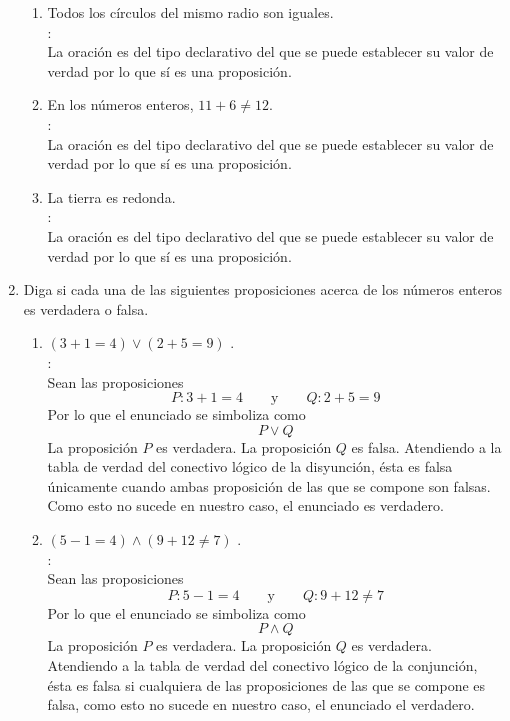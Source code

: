 \begin{enumerate}[label=0.1.\arabic*]
\begin{enumerate}[label=\arabic*)]
		\item Todos los círculos del mismo radio son iguales. \\
		\solucion: \\
		La oración es del tipo declarativo del que se puede establecer su valor de verdad por lo que sí es una proposición.
		
		\item En los números enteros, $ 11+6 \neq 12 $. \\
		\solucion: \\
		La oración es del tipo declarativo del que se puede establecer su valor de verdad por lo que sí es una proposición.
		
		\item La tierra es redonda. \\
		\solucion: \\
		La oración es del tipo declarativo del que se puede establecer su valor de verdad por lo que sí es una proposición.
		
	\end{enumerate}

	\item Diga si cada una de las siguientes proposiciones acerca de los números enteros es verdadera o falsa.
	\begin{enumerate}[label=\arabic*)]
		\item $ (3+1 = 4) \vee (2+5 = 9) $ . \\
		\solucion: \\
		Sean las proposiciones
		\[ P: 3+1 = 4 \qquad \text{y} \qquad Q: 2+5 = 9\]
		Por lo que el enunciado se simboliza como
		\[ P \vee Q \]
		La proposición $ P $ es verdadera. La proposición $ Q $ es falsa. Atendiendo a la tabla de verdad del conectivo lógico de la disyunción, ésta es falsa únicamente cuando ambas proposición de las que se compone son falsas. Como esto no sucede en nuestro caso, el enunciado es verdadero.
		
		\item $ (5-1 = 4) \wedge (9+12 \neq 7) $ . \\
		\solucion: \\
		Sean las proposiciones
		\[ P: 5-1 = 4 \qquad \text{y} \qquad Q: 9+12 \neq 7\]
		Por lo que el enunciado se simboliza como
		\[ P \wedge Q \]
		La proposición $ P $ es verdadera. La proposición $ Q $ es verdadera. Atendiendo a la tabla de verdad del conectivo lógico de la conjunción, ésta es falsa si cualquiera de las proposiciones de las que se compone es falsa, como esto no sucede en nuestro caso, el enunciado el verdadero.
		

\end{enumerate}
\end{enumerate}
